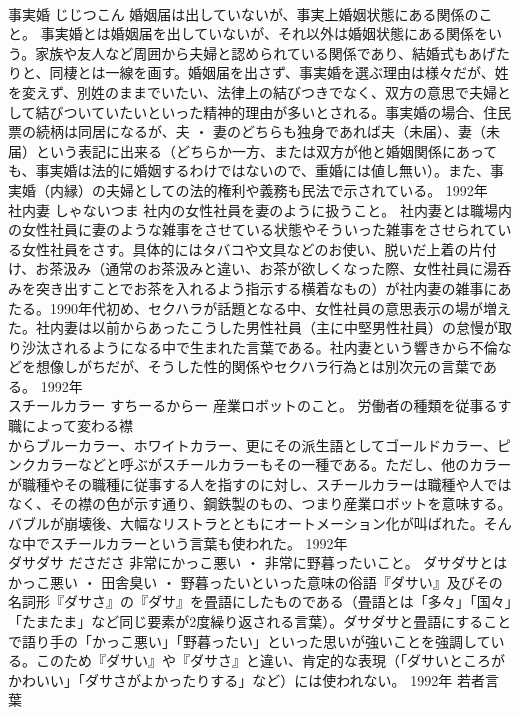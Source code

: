 \documentclass[8pt]{extreport}
\begin{document}
\begin{CJK}{UTF8}{min}
\\	事実婚	じじつこん	婚姻届は出していないが、事実上婚姻状態にある関係のこと。	事実婚とは婚姻届を出していないが、それ以外は婚姻状態にある関係をいう。家族や友人など周囲から夫婦と認められている関係であり、結婚式もあげたりと、同棲とは一線を画す。婚姻届を出さず、事実婚を選ぶ理由は様々だが、姓を変えず、別姓のままでいたい、法律上の結びつきでなく、双方の意思で夫婦として結びついていたいといった精神的理由が多いとされる。事実婚の場合、住民票の続柄は同居になるが、夫 ・ 妻のどちらも独身であれば夫（未届）、妻（未届）という表記に出来る（どちらか一方、または双方が他と婚姻関係にあっても、事実婚は法的に婚姻するわけではないので、重婚には値し無い）。また、事実婚（内縁）の夫婦としての法的権利や義務も民法で示されている。	1992年	
\\	社内妻	しゃないつま	社内の女性社員を妻のように扱うこと。	社内妻とは職場内の女性社員に妻のような雑事をさせている状態やそういった雑事をさせられている女性社員をさす。具体的にはタバコや文具などのお使い、脱いだ上着の片付け、お茶汲み（通常のお茶汲みと違い、お茶が欲しくなった際、女性社員に湯呑みを突き出すことでお茶を入れるよう指示する横着なもの）が社内妻の雑事にあたる。1990年代初め、セクハラが話題となる中、女性社員の意思表示の場が増えた。社内妻は以前からあったこうした男性社員（主に中堅男性社員）の怠慢が取り沙汰されるようになる中で生まれた言葉である。社内妻という響きから不倫などを想像しがちだが、そうした性的関係やセクハラ行為とは別次元の言葉である。	1992年	
\\	スチールカラー	すちーるからー	産業ロボットのこと。	労働者の種類を従事るす職によって変わる襟
\\	からブルーカラー、ホワイトカラー、更にその派生語としてゴールドカラー、ピンクカラーなどと呼ぶがスチールカラーもその一種である。ただし、他のカラーが職種やその職種に従事する人を指すのに対し、スチールカラーは職種や人ではなく、その襟の色が示す通り、鋼鉄製のもの、つまり産業ロボットを意味する。バブルが崩壊後、大幅なリストラとともにオートメーション化が叫ばれた。そんな中でスチールカラーという言葉も使われた。	1992年	
\\	ダサダサ	ださださ	非常にかっこ悪い ・ 非常に野暮ったいこと。	ダサダサとはかっこ悪い ・ 田舎臭い ・ 野暮ったいといった意味の俗語『ダサい』及びその名詞形『ダサさ』の『ダサ』を畳語にしたものである（畳語とは「多々」「国々」「たまたま」など同じ要素が2度繰り返される言葉）。ダサダサと畳語にすることで語り手の「かっこ悪い」「野暮ったい」といった思いが強いことを強調している。このため『ダサい』や『ダサさ』と違い、肯定的な表現（「ダサいところがかわいい」「ダサさがよかったりする」など）には使われない。	1992年	若者言葉	

\end{CJK}
\end{document}

